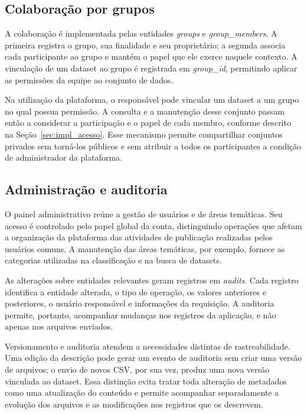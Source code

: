 \subsection{Colaboração por grupos}\label{sec:impl_grupos}

A colaboração é implementada pelas entidades \textit{groups} e \textit{group\_members}. A primeira registra o grupo, sua finalidade e seu proprietário; a segunda associa cada participante ao grupo e mantém o papel que ele exerce naquele contexto. A vinculação de um dataset ao grupo é registrada em \textit{group\_id}, permitindo aplicar as permissões da equipe ao conjunto de dados.

Na utilização da plataforma, o responsável pode vincular um dataset a um grupo no qual possua permissão. A consulta e a manutenção desse conjunto passam então a considerar a participação e o papel de cada membro, conforme descrito na Seção~\ref{sec:impl_acesso}. Esse mecanismo permite compartilhar conjuntos privados sem torná-los públicos e sem atribuir a todos os participantes a condição de administrador da plataforma.

\subsection{Administração e auditoria}\label{sec:impl_auditoria}

O painel administrativo reúne a gestão de usuários e de áreas temáticas. Seu acesso é controlado pelo papel global da conta, distinguindo operações que afetam a organização da plataforma das atividades de publicação realizadas pelos usuários comuns. A manutenção das áreas temáticas, por exemplo, fornece as categorias utilizadas na classificação e na busca de datasets.

As alterações sobre entidades relevantes geram registros em \textit{audits}. Cada registro identifica a entidade alterada, o tipo de operação, os valores anteriores e posteriores, o usuário responsável e informações da requisição. A auditoria permite, portanto, acompanhar mudanças nos registros da aplicação, e não apenas nos arquivos enviados.

Versionamento e auditoria atendem a necessidades distintas de rastreabilidade. Uma edição da descrição pode gerar um evento de auditoria sem criar uma versão de arquivos; o envio de novos CSV, por sua vez, produz uma nova versão vinculada ao dataset. Essa distinção evita tratar toda alteração de metadados como uma atualização do conteúdo e permite acompanhar separadamente a evolução dos arquivos e as modificações nos registros que os descrevem.

